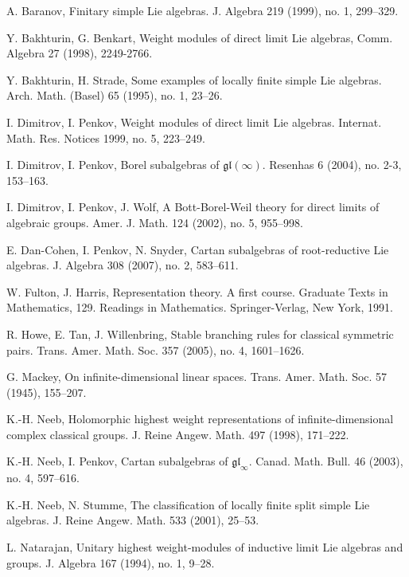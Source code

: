 \documentclass[12pt,reqno]{amsart}
\numberwithin{equation}{section}
\theoremstyle{plain}
\theoremstyle{definition}
\def\gl{\mathfrak{gl}}
\begin{document}
\begin{thebibliography}{}
\frenchspacing

A. Baranov, %
Finitary simple Lie algebras.  J. Algebra  219 (1999),  no. 1,
299--329.

Y. Bakhturin, G. Benkart, %
Weight modules of direct limit Lie algebras, %
Comm. Algebra 27 (1998), 2249-2766.

Y. Bakhturin, H. Strade, %
Some examples of locally finite simple Lie algebras.  Arch. Math.
(Basel)  65  (1995),  no. 1, 23--26.

I. Dimitrov, I. Penkov, %
Weight modules of direct limit Lie algebras.  Internat. Math. Res.
Notices  1999,  no. 5, 223--249.

I. Dimitrov, I. Penkov, %
Borel subalgebras of $\gl(\infty)$.  Resenhas  6  (2004),  no. 2-3,
153--163.

I. Dimitrov, I. Penkov, J. Wolf, %
A Bott-Borel-Weil theory for direct limits of algebraic groups.
Amer. J. Math.  124  (2002),  no. 5, 955--998.

E. Dan-Cohen, I. Penkov, N. Snyder, %
Cartan subalgebras of root-reductive Lie algebras.  J. Algebra 308
(2007), no. 2, 583--611.


W. Fulton, J. Harris, %
Representation theory. A first course.
Graduate Texts in Mathematics, 129. Readings in Mathematics.
Springer-Verlag, New York, 1991.


R. Howe, E. Tan, J. Willenbring, %
Stable branching rules for classical symmetric pairs.  Trans. Amer.
Math. Soc.  357  (2005),  no. 4, 1601--1626.

G. Mackey, %
On infinite-dimensional linear spaces.  Trans. Amer. Math. Soc.  57  (1945), 155--207.

K.-H. Neeb, %
Holomorphic highest weight representations of infinite-dimensional
complex classical groups.  J. Reine Angew. Math.  497  (1998),
171--222.

K.-H. Neeb, I. Penkov, %
Cartan subalgebras of $\gl_\infty$. Canad. Math. Bull. 46 (2003),
no. 4, 597--616.

K.-H. Neeb, N. Stumme, %
The classification of locally finite split simple Lie algebras. J.
Reine Angew. Math. 533 (2001), 25--53.

L. Natarajan, %
Unitary highest weight-modules of inductive limit Lie algebras and
groups. J. Algebra 167 (1994), no. 1, 9--28.


\end{thebibliography}
\end{document}
